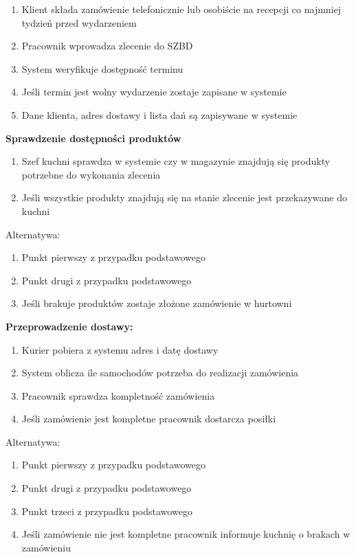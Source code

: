 \documentclass[12pt]{article}
\begin{document}
\begin{enumerate}
    \item Klient składa zamówienie telefonicznie lub osobiście na recepcji co najmniej tydzień przed wydarzeniem
    \item Pracownik wprowadza zlecenie do SZBD
    \item System weryfikuje dostępność terminu
    \item Jeśli termin jest wolny wydarzenie zostaje zapisane w systemie
    \item Dane klienta, adres dostawy i lista dań są zapisywane w systemie
\end{enumerate}

\textbf{Sprawdzenie dostępności produktów}

\begin{enumerate}
    \item Szef kuchni sprawdza w systemie czy w magazynie znajdują się produkty potrzebne do wykonania zlecenia
    \item Jeśli wszystkie produkty znajdują się na stanie zlecenie jest przekazywane do kuchni
\end{enumerate}

Alternatywa:
\begin{enumerate}
    \item Punkt pierwszy z przypadku podstawowego
    \item Punkt drugi z przypadku podstawowego
    \item Jeśli brakuje produktów zostaje złożone zamówienie w hurtowni
\end{enumerate}

\textbf{Przeprowadzenie dostawy:}
\begin{enumerate}
    \item Kurier pobiera z systemu adres i datę dostawy
    \item System oblicza ile samochodów potrzeba do realizacji zamówienia
    \item Pracownik sprawdza kompletność zamówienia
    \item Jeśli zamówienie jest kompletne pracownik dostarcza posiłki
\end{enumerate}

Alternatywa:
\begin{enumerate}
    \item Punkt pierwszy z przypadku podstawowego
    \item Punkt drugi z przypadku podstawowego
    \item Punkt trzeci z przypadku podstawowego
    \item Jeśli zamówienie nie jest kompletne pracownik informuje kuchnię o brakach w zamówieniu
\end{enumerate}
\end{document}
